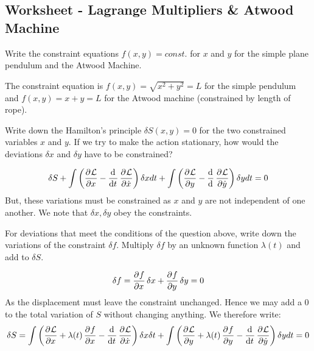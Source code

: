 \subsection{Worksheet - Lagrange Multipliers \& Atwood Machine}
\begin{p}
Write the constraint equations $f(x,y) = const.$ for $x$ and $y$ for the simple plane pendulum and the Atwood Machine.
\end{p}
\begin{s}
The constraint equation is $f(x, y) = \sqrt{x^2 + y^2} = L$ for the simple pendulum and $f(x, y) = x + y = L$ for the Atwood machine (constrained by length of rope).
\end{s}

\begin{p}
Write down the Hamilton's principle $\delta S(x,y) = 0$ for the two constrained variables $x$ and $y$. If we try to make the action stationary, how would the deviations $\delta x$ and $\delta y$ have to be constrained?
\end{p}
\begin{s}
\begin{align*}
    \delta S + \int\left(\dpd{\LL}{x} - \dod{}{t}\dpd{\LL}{\dot{x}}\right)\delta x dt + \int \left(\dpd{\LL}{y} - \dod{}{}\dpd{\LL}{\dot{y}}\right)\delta y dt = 0
\end{align*}
But, these variations must be constrained as $x$ and $y$ are not independent of one another. We note that $\delta x, \delta y$ obey the constraints.
\end{s}

\begin{p}
For deviations that meet the conditions of the question above, write down the variations of the constraint $\delta f$. Multiply $\delta f$ by an unknown function $\lambda(t)$ and add to $\delta S$.
\end{p}
\begin{s}
\[\delta f = \dpd{f}{x}\delta x + \dpd{f}{y}\delta y = 0\]
As the displacement must leave the constraint unchanged. Hence we may add a $0$ to the total variation of $S$ without changing anything. We therefore write:
\[\delta S = \int \left(\dpd{\LL}{x} + \lambda(t)\dpd{f}{x} - \dod{}{t}\dpd{\LL}{\dot{x}}\right)\delta x \delta t + \int\left(\dpd{\LL}{y} + \lambda(t)\dpd{f}{y} - \dod{}{t}\dpd{\LL}{\dot{y}}\right)\delta y dt = 0\]
\end{s}

